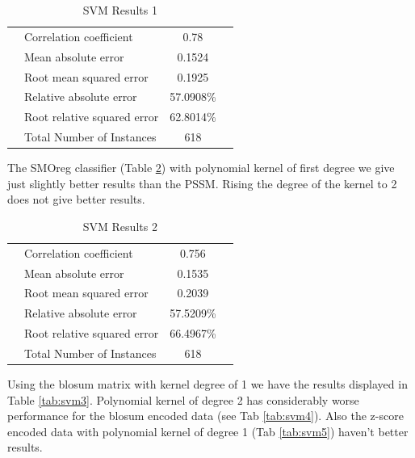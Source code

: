 \begin{table}[ht]
\begin{center}
\begin{tabular}{ ll c r }
\hline
 & Correlation coefficient &                 0.78  \\
 & Mean absolute error      &                0.1524 \\
 & Root mean squared error   &               0.1925 \\
 & Relative absolute error    &             57.0908\%  \\
 & Root relative squared error &            62.8014\%  \\
 & Total Number of Instances    &          618 \\
\hline
\end{tabular}
\label{tab:svm1}
\caption{SVM Results 1}
\end{center}
\end{table}


The SMOreg classifier (Table \ref{tab:svm2}) with polynomial kernel of first degree we give just slightly better results than the PSSM. Rising the degree of the kernel to 2 does not give better results.

\begin{table}[ht]
\begin{center}
\begin{tabular}{ ll c r }
\hline
 & Correlation coefficient &                 0.756 \\
 & Mean absolute error      &                0.1535 \\
 & Root mean squared error   &               0.2039 \\
 & Relative absolute error   &              57.5209\% \\
 & Root relative squared error &            66.4967\% \\
 & Total Number of Instances    &          618 \\
\hline
\end{tabular}
\label{tab:svm2}
\caption{SVM Results 2}

\end{center}
\end{table}

Using the blosum matrix with kernel degree of 1 we have the results displayed in Table \ref{tab:svm3}. Polynomial kernel of degree 2 has considerably worse performance for the blosum encoded data (see Tab \ref{tab:svm4}). Also the z-score encoded data with polynomial kernel of degree 1 (Tab \ref{tab:svm5}) haven't better results.



